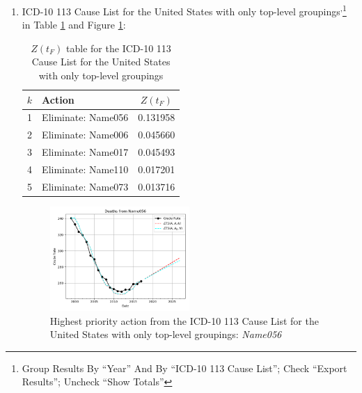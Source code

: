 \documentclass[12pt, a4paper, twocolumn]{article}
\begin{document}
\begin{enumerate}
  \vfill\eject
  \item ICD-10 113 Cause List for the United States with only top-level groupings\cite{centers2017underlying}\textsuperscript{,}\footnote{Group Results By \enquote{Year} And By \enquote{ICD-10 113 Cause List}; Check \enquote{Export Results}; Uncheck \enquote{Show Totals}} in Table \ref{table:ztable3} and Figure \ref{fig:k3}:
    \begin{table}[H]
      \centering
      \begin{tabular}{clc}
        \toprule
          $k$ & Action             & $Z(t_F)$ \\
        \midrule
          1   & Eliminate: Name056 & 0.131958 \\
          2   & Eliminate: Name006 & 0.045660 \\
          3   & Eliminate: Name017 & 0.045493 \\
          4   & Eliminate: Name110 & 0.017201 \\
          5   & Eliminate: Name073 & 0.013716 \\
        \bottomrule
      \end{tabular}
      \caption{$Z(t_F)$ table for the ICD-10 113 Cause List for the United States with only top-level groupings}
      \label{table:ztable3}
    \end{table}
    \begin{figure}[H]
      \centering
      \includegraphics[width=0.5\textwidth]{results/US_ICD10_113_SELECTED_CAUSES_ROOTS/Name056_ets.png}
      \caption{Highest priority action from the ICD-10 113 Cause List for the United States with only top-level groupings: \textit{Name056}}\label{fig:k3}
    \end{figure}


\end{enumerate}
\end{document}
